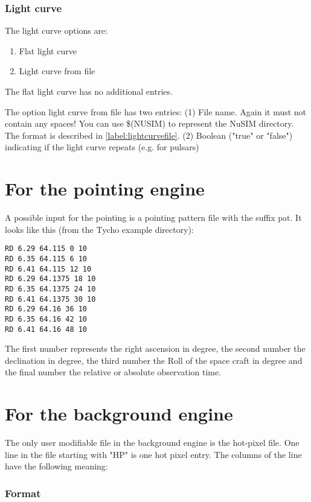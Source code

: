 \subsubsection{Light curve}

The light curve options are:
\begin{enumerate}
\item Flat light curve
\item Light curve from file
\end{enumerate}

The flat light curve has no additional entries.

The option light curve from file has two entries:
(1) File name. Again it must not contain any spaces! You can use \$(NUSIM) to represent the NuSIM directory. The format is described in \ref{label:lightcurvefile}.
(2) Boolean ("true" or "false") indicating if the light curve repeats (e.g. for pulsars)

\section{For the pointing engine \label{inputformats:pointing}}

A possible input for the pointing is a pointing pattern file with the suffix pat.
It looks like this (from the Tycho example directory):
\begin{verbatim}
RD 6.29 64.115 0 10
RD 6.35 64.115 6 10
RD 6.41 64.115 12 10
RD 6.29 64.1375 18 10
RD 6.35 64.1375 24 10
RD 6.41 64.1375 30 10
RD 6.29 64.16 36 10
RD 6.35 64.16 42 10
RD 6.41 64.16 48 10
\end{verbatim}

The first number represents the right ascension in degree, the second number the declination in degree, the third number the Roll of the space craft in degree and the final number the relative or absolute observation time.


\section{For the background engine\label{label:hotpixelformat}}

The only user modifiable file in the background engine is the hot-pixel file.
One line in the file starting with "HP" is one hot pixel entry. The columns of the line have the following meaning:

\subsubsection{Format}

